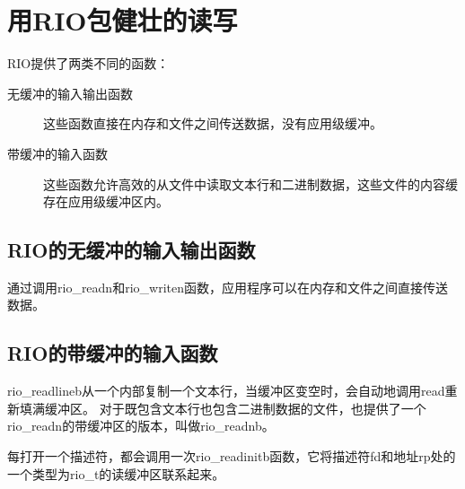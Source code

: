 
\section{用RIO包健壮的读写}
{
    RIO提供了两类不同的函数：

    \begin{description}
        \item[无缓冲的输入输出函数] 这些函数直接在内存和文件之间传送数据，没有应用级缓冲。
        \item[带缓冲的输入函数] 这些函数允许高效的从文件中读取文本行和二进制数据，这些文件的内容缓存在应用级缓冲区内。
    \end{description}

    \subsection{RIO的无缓冲的输入输出函数}
    {
        通过调用rio\_readn和rio\_writen函数，应用程序可以在内存和文件之间直接传送数据。
    }

    \subsection{RIO的带缓冲的输入函数}
    {
        rio\_readlineb从一个内部复制一个文本行，当缓冲区变空时，会自动地调用read重新填满缓冲区。
        对于既包含文本行也包含二进制数据的文件，也提供了一个rio\_readn的带缓冲区的版本，叫做rio\_readnb。

        每打开一个描述符，都会调用一次rio\_readinitb函数，它将描述符fd和地址rp处的一个类型为rio\_t的读缓冲区联系起来。
    }
}
